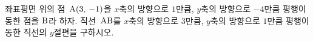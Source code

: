 좌표평면 위의 점~$\mathrm{A}(3,\mkern3mu -1)$을 $x$축의 방향으로 $1$만큼, $y$축의 방향으로 $-4$만큼 평행이동한 점을 $\mathrm{B}$라 하자. 직선~$\mathrm{AB}$를 $x$축의 방향으로 $3$만큼, $y$축의 방향으로 $1$만큼 평행이동한 직선의 $y$절편을 구하시오.
